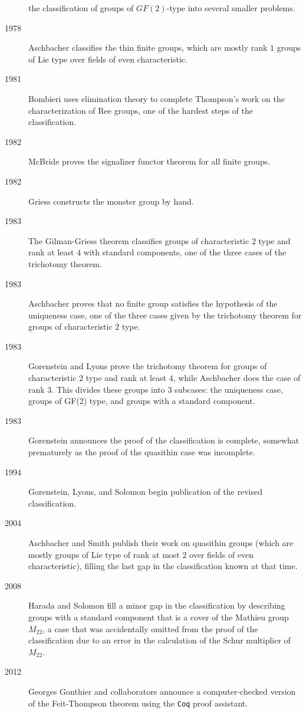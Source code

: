\documentclass{ximera}
\begin{document}
\begin{description}
  the classification of groups of $GF(2)$-type into several smaller
  problems.
\item[1978] Aschbacher classifies the thin finite groups, which are
  mostly rank $1$ groups of Lie type over fields of even
  characteristic.
\item[1981] Bombieri uses elimination theory to complete Thompson's
  work on the characterization of Ree groups, one of the hardest steps
  of the classification.
\item[1982] McBride proves the signalizer functor theorem for all
  finite groups.
\item[1982] Griess constructs the monster group by hand.
\item[1983] The Gilman-Griess theorem classifies groups of
  characteristic $2$ type and rank at least $4$ with standard
  components, one of the three cases of the trichotomy theorem.
\item[1983] Aschbacher proves that no finite group satisfies the
  hypothesis of the uniqueness case, one of the three cases given by
  the trichotomy theorem for groups of characteristic $2$ type.
\item[1983] Gorenstein and Lyons prove the trichotomy theorem for
  groups of characteristic $2$ type and rank at least $4$, while
  Aschbacher does the case of rank $3$. This divides these groups into
  3 subcases: the uniqueness case, groups of GF(2) type, and groups
  with a standard component.
\item[1983] Gorenstein announces the proof of the classification is
  complete, somewhat prematurely as the proof of the quasithin case
  was incomplete.
\item[1994] Gorenstein, Lyons, and Solomon begin publication of the
  revised classification.
\item[2004] Aschbacher and Smith publish their work on quasithin
  groups (which are mostly groups of Lie type of rank at most $2$ over
  fields of even characteristic), filling the last gap in the
  classification known at that time.
\item[2008] Harada and Solomon fill a minor gap in the classification
  by describing groups with a standard component that is a cover of
  the Mathieu group $M_{22}$, a case that was accidentally omitted
  from the proof of the classification due to an error in the
  calculation of the Schur multiplier of $M_{22}$.
\item[2012] Georges Gonthier and collaborators announce a
  computer-checked version of the Feit-Thompson theorem using the \texttt{Coq}
  proof assistant.
\end{description}
\end{document}
